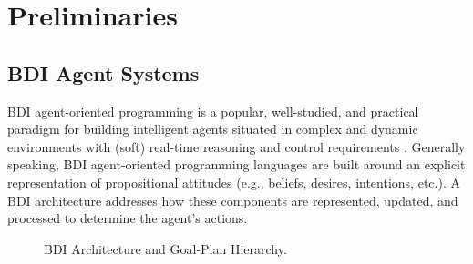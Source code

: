 \section{Preliminaries}\label{sec:preliminaries}

\newcommand{\success}{\mbox{\emph{succ}}}
\newcommand{\failure}{\mbox{\emph{fail}}}

\newcommand{\procedurefont}[1]{\mathsf{#1}}
\newcommand{\StableGoal}{\procedurefont{StableGoal}}
\newcommand{\RecordTrace}{\procedurefont{RecordFailedTrace}}
\newcommand{\RecordWorldDT}{\procedurefont{RecordWorldDT}}



\subsection{BDI Agent Systems}\label{sec:bdi_programming}

BDI agent-oriented programming is a popular, well-studied, and practical paradigm
for building intelligent agents situated in complex and dynamic environments with
(soft) real-time reasoning and control requirements
\cite{Georgeff89-PRS,Benfield:AAMAS06}.
Generally speaking, BDI agent-oriented programming languages are built
around an 
explicit representation of propositional attitudes (e.g., beliefs, desires,
intentions, etc.). A BDI architecture addresses how these components are
represented, updated, and processed to determine the agent's actions.


\begin{figure*}[t]
\begin{center}
%
\qquad
{}
\caption{BDI Architecture and Goal-Plan Hierarchy.}
\label{fig:BDI-concepts}
\end{center}
\end{figure*}


